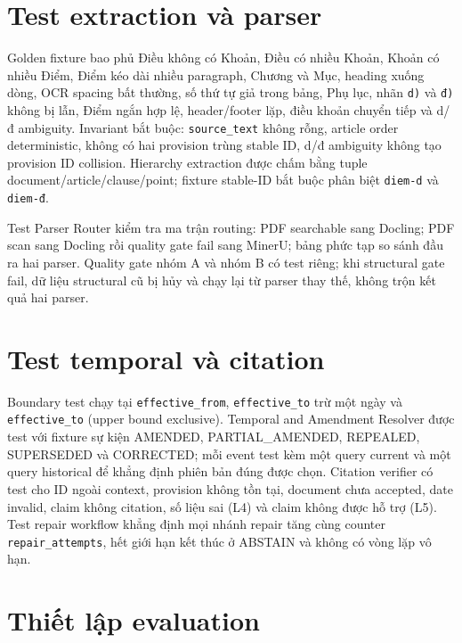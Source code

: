 \documentclass[a4paper,12pt]{extreport}
\newcommand{\code}[1]{\texttt{#1}}
\begin{document}
\section{Test extraction và parser}

Golden fixture bao phủ Điều không có Khoản, Điều có nhiều Khoản, Khoản có nhiều Điểm, Điểm kéo dài nhiều paragraph, Chương và Mục, heading xuống dòng, OCR spacing bất thường, số thứ tự giả trong bảng, Phụ lục, nhãn \code{d)} và \code{đ)} không bị lẫn, Điểm ngắn hợp lệ, header/footer lặp, điều khoản chuyển tiếp và d/đ ambiguity. Invariant bắt buộc: \code{source\_text} không rỗng, article order deterministic, không có hai provision trùng stable ID, d/đ ambiguity không tạo provision ID collision. Hierarchy extraction được chấm bằng tuple document/article/clause/point; fixture stable-ID bắt buộc phân biệt \code{diem-d} và \code{diem-đ}.

Test Parser Router kiểm tra ma trận routing: PDF searchable sang Docling; PDF scan sang Docling rồi quality gate fail sang MinerU; bảng phức tạp so sánh đầu ra hai parser. Quality gate nhóm A và nhóm B có test riêng; khi structural gate fail, dữ liệu structural cũ bị hủy và chạy lại từ parser thay thế, không trộn kết quả hai parser.

\section{Test temporal và citation}

\begin{sloppypar}
Boundary test chạy tại \code{effective\_from}, \code{effective\_to} trừ một ngày và \code{effective\_to} (upper bound exclusive). Temporal and Amendment Resolver được test với fixture sự kiện AMENDED, PARTIAL\_AMENDED, REPEALED, SUPERSEDED và CORRECTED; mỗi event test kèm một query current và một query historical để khẳng định phiên bản đúng được chọn. Citation verifier có test cho ID ngoài context, provision không tồn tại, document chưa accepted, date invalid, claim không citation, số liệu sai (L4) và claim không được hỗ trợ (L5). Test repair workflow khẳng định mọi nhánh repair tăng cùng counter \code{repair\_attempts}, hết giới hạn kết thúc ở ABSTAIN và không có vòng lặp vô hạn.
\end{sloppypar}

\section{Thiết lập evaluation}
\end{document}
